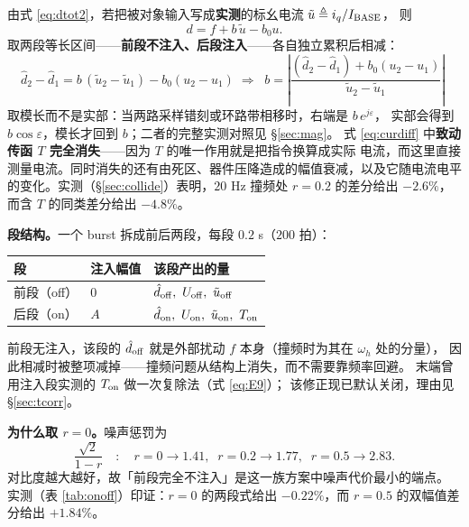 \documentclass[11pt,a4paper]{ctexart}
\begin{document}
由式 \eqref{eq:dtot2}，若把被对象输入写成\textbf{实测}的标幺电流 $\tilde u\triangleq i_q/I_{\rm BASE}$，
则
\begin{equation}
d=f+b\,\tilde u-b_0u .
\label{eq:dmeas}
\end{equation}
取两段等长区间——\textbf{前段不注入、后段注入}——各自独立累积后相减：
\begin{equation}
\hat d_2-\hat d_1=b\,(\tilde u_2-\tilde u_1)-b_0(u_2-u_1)
\;\Longrightarrow\;
\boxed{\;b=\left|\frac{(\hat d_2-\hat d_1)+b_0(u_2-u_1)}{\tilde u_2-\tilde u_1}\right|\;}
\label{eq:curdiff}
\end{equation}
取模长而不是实部：当两路采样错刻或环路带相移时，右端是 $b\,e^{j\varepsilon}$，
实部会得到 $b\cos\varepsilon$，模长才回到 $b$；二者的完整实测对照见 \S\ref{sec:mag}。
式 \eqref{eq:curdiff} 中\textbf{致动传函 $T$ 完全消失}——因为 $T$ 的唯一作用就是把指令换算成实际
电流，而这里直接测量电流。同时消失的还有由死区、器件压降造成的幅值衰减，以及它随电流电平
的变化。实测（\S\ref{sec:collide}）表明，$20$ Hz 撞频处 $r=0.2$ 的差分给出 $-2.6\%$，而含 $T$
的同类差分给出 $-4.8\%$。

\textbf{段结构。}一个 burst 拆成前后两段，每段 $0.2$ s（$200$ 拍）：

\begin{center}
\begin{tabular}{lll}
\toprule
段 & 注入幅值 & 该段产出的量\\
\midrule
前段（off） & $0$ & $\hat d_{\rm off},\ U_{\rm off},\ \tilde u_{\rm off}$\\
后段（on）  & $A$ & $\hat d_{\rm on},\ U_{\rm on},\ \tilde u_{\rm on},\ T_{\rm on}$\\
\bottomrule
\end{tabular}
\end{center}

前段无注入，该段的 $\hat d_{\rm off}$ 就是外部扰动 $f$ 本身（撞频时为其在 $\omega_h$ 处的分量），
因此相减时被整项减掉——撞频问题从结构上消失，而不需要靠频率回避。
末端曾用注入段实测的 $T_{\rm on}$ 做一次复除法（式 \eqref{eq:E9}）；
该修正现已默认关闭，理由见 \S\ref{sec:tcorr}。

\textbf{为什么取 $r=0$。}噪声惩罚为
\begin{equation}
\frac{\sqrt2}{1-r}\quad:\quad
r=0\to1.41,\;\;r=0.2\to1.77,\;\;r=0.5\to2.83 .
\label{eq:E4b}
\end{equation}
对比度越大越好，故「前段完全不注入」是这一族方案中噪声代价最小的端点。
实测（表 \ref{tab:onoff}）印证：$r=0$ 的两段式给出 $-0.22\%$，而 $r=0.5$ 的双幅值差分给出 $+1.84\%$。
\end{document}

